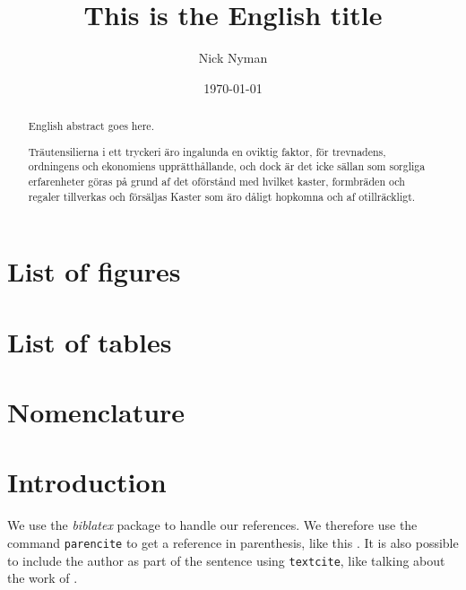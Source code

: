 \documentclass{kththesis}
\title{This is the English title}
\author{Nick Nyman}
\date{\today}
\begin{document}
\frontmatter

\titlepage

\begin{abstract}
  English abstract goes here.

  \blindtext
\end{abstract}


\begin{otherlanguage}{swedish}
  \begin{abstract}
    Träutensilierna i ett tryckeri äro ingalunda en oviktig faktor,
    för trevnadens, ordningens och ekonomiens upprätthållande, och
    dock är det icke sällan som sorgliga erfarenheter göras på grund
    af det oförstånd med hvilket kaster, formbräden och regaler
    tillverkas och försäljas Kaster som äro dåligt hopkomna och af
    otillräckligt.
  \end{abstract}
\end{otherlanguage}

\chapter*{List of figures}
 

\chapter*{List of tables}
 

\chapter*{Nomenclature}
 

\tableofcontents


\mainmatter

\chapter{Introduction}

We use the \emph{biblatex} package to handle our references.  We therefore use the
command \texttt{parencite} to get a reference in parenthesis, like this
\parencite{heisenberg2015}.  It is also possible to include the author
as part of the sentence using \texttt{textcite}, like talking about
the work of \textcite{einstein2016}.
\end{document}
